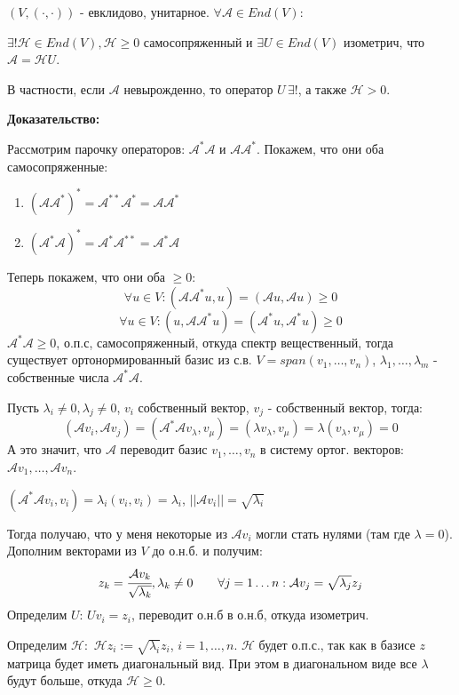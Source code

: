 $(V, (\cdot,\cdot))$ - евклидово, унитарное. $\forall \mathcal{A} \in End(V):$

$\exists! \mathcal{H} \in End(V), \mathcal{H}\geq 0$ самосопряженный и $\exists U \in End(V)$ изометрич, что $\mathcal{A} = \mathcal{H}U$.

В частности, если $\mathcal{A}$ невырожденно, то оператор $U \, \exists!$, а также $\mathcal{H} >0$.

\textbf{Доказательство:}

Рассмотрим парочку операторов: $\mathcal{A}^* \mathcal{A}$ и $\mathcal{A}\mathcal{A}^*$. Покажем, что они оба самосопряженные:
\begin{enumerate}
    \item $(\mathcal{A}\mathcal{A}^*)^* = \mathcal{A}^{**}\mathcal{A}^* = \mathcal{A}\mathcal{A}^*$
     \item $(\mathcal{A}^*\mathcal{A})^* = \mathcal{A}^{*}\mathcal{A}^{**} = \mathcal{A}^*\mathcal{A}$
\end{enumerate}
Теперь покажем, что они оба $\geq 0$: 
$$\forall u \in V: (\mathcal{AA}^*u,u)=(\mathcal{A}u, \mathcal{A}u) \geq  0$$
$$\forall u \in V: (u,\mathcal{AA}^*u)=(\mathcal{A}^*u, \mathcal{A}^*u) \geq  0$$
$\mathcal{A}^*\mathcal{A} \geq 0$, о.п.с, самосопряженный, откуда спектр вещественный, тогда существует ортонормированный базис из с.в. $V  =span(v_1,\ldots,v_n)$, $\lambda_1,\ldots,\lambda_m$ - собственные числа  $\mathcal{A}^*\mathcal{A}$.


Пусть $\lambda_i \neq 0, \lambda_j \neq 0$, $v_i$ собственный вектор, $v_j$ - собственный вектор, тогда:
$$(\mathcal{A} v_i, \mathcal{A}v_j)=(\mathcal{A}^* \mathcal{A} v_\lambda , v_\mu) = (\lambda v_\lambda,v_\mu) = \lambda (v_\lambda, v_\mu) = 0$$
А это значит, что $\mathcal{A}$ переводит базис $v_1,\ldots, v_n$ в систему ортог. векторов: $\mathcal{A}v_1,\ldots, \mathcal{A}v_n$.

$(\mathcal{A}^*\mathcal{A}v_i,v_i) = \lambda_i (v_i,v_i) = \lambda_i$, $||\mathcal{A}v_i|| = \sqrt{\lambda_i}$

Тогда получаю, что у меня некоторые из $\mathcal{A}v_i$ могли стать нулями (там где $\lambda = 0$). Дополним векторами из $V$ до о.н.б. и получим:
$$ z_k = \cfrac{\mathcal{A}v_k}{\sqrt{\lambda_k}}, \lambda_k \neq 0 \quad \quad 
\forall j = 1\ldots n: \mathcal{A}v_j = \sqrt{\lambda_j} z_j$$
Определим $U$: $Uv_i = z_i$, переводит о.н.б в о.н.б, откуда изометрич.

Определим $\mathcal{H}:$ $\mathcal{H}z_i := \sqrt{\lambda_i}z_i$, $i = 1,\ldots, n$.  $\mathcal{H}$ будет о.п.с., так как в базисе $z$ матрица будет иметь диагональный вид. При этом в диагональном виде все $\lambda$ будут больше, откуда $\mathcal{H}\geq 0$.

